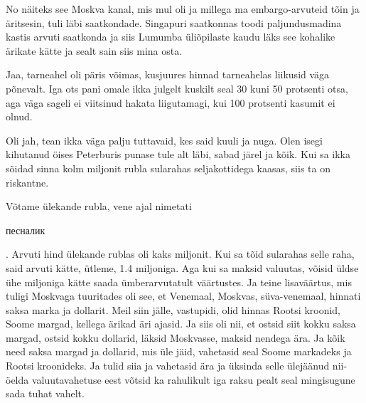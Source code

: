 
No näiteks see Moskva kanal, mis mul oli ja millega ma embargo-arvuteid tõin ja äritsesin, tuli läbi saatkondade. Singapuri saatkonnas toodi paljundusmadina kastis arvuti saatkonda ja siis Lumumba üliõpilaste kaudu läks see kohalike ärikate kätte ja sealt sain siis mina osta. 


Jaa, tarneahel oli päris võimas, kusjuures hinnad tarneahelas liikusid väga põnevalt. Iga ots pani omale ikka julgelt kuskilt seal 30 kuni 50 protsenti otsa, aga väga sageli ei viitsinud hakata liigutamagi, kui 100 protsenti kasumit ei olnud. 


Oli jah, tean ikka väga palju tuttavaid, kes said kuuli ja nuga. Olen isegi kihutanud öises Peterburis punase tule alt läbi, sabad järel ja kõik. Kui sa ikka sõidad sinna kolm miljonit rubla sularahas seljakottidega kaasas, siis ta on riskantne.

Võtame ülekande rubla, vene ajal nimetati \begin{russian}песналик\end{russian}. Arvuti hind ülekande rublas oli kaks miljonit. Kui sa tõid sularahas selle raha, said arvuti kätte, ütleme, 1.4 miljoniga. Aga kui sa maksid valuutas, võisid üldse  ühe miljoniga kätte saada ümberarvutatult väärtustes. Ja teine lisaväärtus, mis tuligi  Moskvaga tuuritades oli see, et Venemaal, Moskvas, süva-venemaal, hinnati saksa marka ja  dollarit. Meil siin jälle, vastupidi, olid hinnas Rootsi kroonid, Soome margad, kellega ärikad äri ajasid. Ja siis oli nii, et ostsid siit kokku saksa margad, ostsid kokku dollarid, läksid Moskvasse, maksid nendega ära. Ja kõik need saksa margad ja dollarid, mis üle jäid,  vahetasid seal Soome markadeks ja Rootsi kroonideks. Ja tulid siia ja vahetasid ära ja üksinda selle ülejäänud nii-öelda valuutavahetuse eest võtsid ka rahulikult iga raksu pealt seal mingisugune sada tuhat vahelt. 

